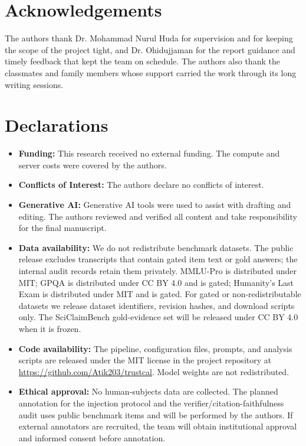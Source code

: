 \documentclass[a4paper,fleqn]{cas-sc}
\begin{document}
\section*{Acknowledgements}

The authors thank Dr. Mohammad Nurul Huda for supervision and for keeping the scope of the project tight, and Dr. Ohidujjaman for the report guidance and timely feedback that kept the team on schedule. The authors also thank the classmates and family members whose support carried the work through its long writing sessions.

\section*{Declarations}
\begin{itemize}
  \item \textbf{Funding:} This research received no external funding. The compute and server costs were covered by the authors.

  \item \textbf{Conflicts of Interest:} The authors declare no conflicts of interest.

  \item \textbf{Generative AI:} Generative AI tools were used to assist with drafting and editing. The authors reviewed and verified all content and take responsibility for the final manuscript.

  \item \textbf{Data availability:} We do not redistribute benchmark datasets. The public release excludes transcripts that contain gated item text or gold answers; the internal audit records retain them privately. MMLU-Pro is distributed under MIT; GPQA is distributed under CC BY 4.0 and is gated; Humanity's Last Exam is distributed under MIT and is gated. For gated or non-redistributable datasets we release dataset identifiers, revision hashes, and download scripts only. The SciClaimBench gold-evidence set will be released under CC BY 4.0 when it is frozen.

  \item \textbf{Code availability:} The pipeline, configuration files, prompts, and analysis scripts are released under the MIT license in the project repository at \url{https://github.com/Atik203/trustcal}. Model weights are not redistributed.

  \item \textbf{Ethical approval:} No human-subjects data are collected. The planned annotation for the injection protocol and the verifier/citation-faithfulness audit uses public benchmark items and will be performed by the authors. If external annotators are recruited, the team will obtain institutional approval and informed consent before annotation.
\end{itemize}
\end{document}
